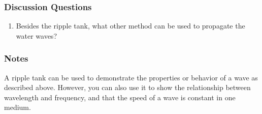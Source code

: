 \subsubsection*{Discussion Questions}
\begin{enumerate}
\item{Besides the ripple tank, what other method can be used to propagate the water waves?}
\end{enumerate}

\subsubsection*{Notes}
A ripple tank can be used to demonstrate the properties or behavior of a wave as described above.  However, you can also use it to show the relationship between wavelength and frequency, and that the speed of a wave is constant in one medium.
